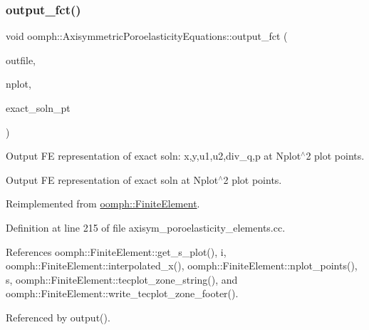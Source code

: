 \mbox{\label{classoomph_1_1AxisymmetricPoroelasticityEquations_ad07311da4796c1481750d4e5872f3aff}} 
\subsubsection{\texorpdfstring{output\+\_\+fct()}{output\_fct()}\hspace{0.1cm}{\footnotesize\ttfamily [1/2]}}
{\footnotesize\ttfamily void oomph\+::\+Axisymmetric\+Poroelasticity\+Equations\+::output\+\_\+fct (\begin{DoxyParamCaption}\item[{std\+::ostream \&}]{outfile,  }\item[{const unsigned \&}]{nplot,  }\item[{\hyperlink{classoomph_1_1FiniteElement_a690fd33af26cc3e84f39bba6d5a85202}{Finite\+Element\+::\+Steady\+Exact\+Solution\+Fct\+Pt}}]{exact\+\_\+soln\+\_\+pt }\end{DoxyParamCaption})\hspace{0.3cm}{\ttfamily [virtual]}}



Output FE representation of exact soln\+: x,y,u1,u2,div\+\_\+q,p at Nplot$^\wedge$2 plot points. 

Output FE representation of exact soln at Nplot$^\wedge$2 plot points. 

Reimplemented from \hyperlink{classoomph_1_1FiniteElement_a22b695c714f60ee6cd145be348042035}{oomph\+::\+Finite\+Element}.



Definition at line 215 of file axisym\+\_\+poroelasticity\+\_\+elements.\+cc.



References oomph\+::\+Finite\+Element\+::get\+\_\+s\+\_\+plot(), i, oomph\+::\+Finite\+Element\+::interpolated\+\_\+x(), oomph\+::\+Finite\+Element\+::nplot\+\_\+points(), s, oomph\+::\+Finite\+Element\+::tecplot\+\_\+zone\+\_\+string(), and oomph\+::\+Finite\+Element\+::write\+\_\+tecplot\+\_\+zone\+\_\+footer().



Referenced by output().

